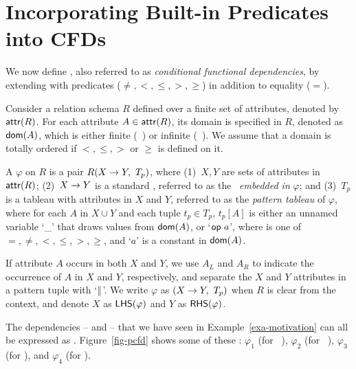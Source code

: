 \section{Incorporating Built-in Predicates into CFDs}
\label{sec-cfd}

We now define \pCFDs, also referred to
as {\em conditional functional dependencies},
by extending \CFDs with
predicates ($\ne, <, \le, >,\ge$) in addition to equality ($=$).

Consider a relation schema $R$ defined over a finite set of
attributes, denoted by $\protect\mathsf{attr}(R)$. For each attribute $A \in
\protect\mathsf{attr}(R)$, its domain is specified in $R$, denoted as $\protect\mathsf{dom}(A)$,
which is either finite (\eg~)
or infinite (\eg~).
We assume \kwlog that a domain is totally ordered if
$<, \le, >$ or $\ge$ is defined on it.


 A \pCFD $\varphi$ on $R$ is a pair
$R(X\rightarrow Y,\ T_p)$, where (1)~$X, Y$ are sets of attributes in
$\protect\mathsf{attr}(R)$; (2)~$X \rightarrow Y$ is a standard \FD, referred to as the
\FD~{\em embedded in} $\varphi$; and (3)~$T_p$ is a tableau with
attributes in $X$ and $Y$, referred to as the {\em pattern tableau}
of $\varphi$, where for each $A$ in $X \cup Y$ and each tuple $t_p
\in T_p$, $t_p[A]$ is either an unnamed
variable `\_' that draws values from $\protect\mathsf{dom}(A)$, or
`$\op a$', where \op is one of $=, \ne,
<, \le, >, \ge$,  and `$a$' is a constant in $\protect\mathsf{dom}(A)$.

If attribute $A$
occurs in both $X$ and $Y$, we use $A_L$ and $A_R$ to indicate the
occurrence of $A$ in $X$ and $Y$, respectively, and separate the $X$
and $Y$ attributes in a pattern tuple with `$\parallel$'.
We write $\varphi$ as $(X \rightarrow Y,\ T_p)$ when $R$ is clear from the
context, and denote $X$ as $\relax{{\ensuremath {\mathsf{LHS}}}}(\varphi)$ and $Y$ as
$\relax{{\ensuremath {\mathsf{RHS}}}}(\varphi)$.

\vspace{-1ex}
\begin{example}
The dependencies -- and --
that
we have seen in Example~\ref{exa-motivation} can all be expressed as \pCFDs.
Figure~\ref{fig-pcfd} shows some of these \pCFDs:
$\varphi_1$ (for \FD\ ),
$\varphi_2$ (for \CFD\ ), $\varphi_3$ (for ),
and $\varphi_4$ (for ).
\eop
\end{example}
\vspace{-1ex}

